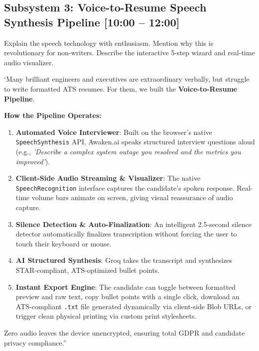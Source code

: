 \documentclass[11pt,a4paper]{article}
\begin{document}
\newpage

\subsection{Subsystem 3: Voice-to-Resume Speech Synthesis Pipeline [10:00 -- 12:00]}

\begin{speakercue}{Explain the speech technology with enthusiasm. Mention why this is revolutionary for non-writers.}
Describe the interactive 5-step wizard and real-time audio visualizer.
\end{speakercue}

`Many brilliant engineers and executives are extraordinary verbally, but struggle to write formatted ATS resumes. For them, we built the \textbf{Voice-to-Resume Pipeline}.

\textbf{How the Pipeline Operates:}
\begin{enumerate}[leftmargin=*]
    \item \textbf{Automated Voice Interviewer}: Built on the browser's native \texttt{SpeechSynthesis} API, Awaken.ai speaks structured interview questions aloud (e.g., \textit{'Describe a complex system outage you resolved and the metrics you improved'}).
    \item \textbf{Client-Side Audio Streaming \& Visualizer}: The native \texttt{SpeechRecognition} interface captures the candidate's spoken response. Real-time volume bars animate on screen, giving visual reassurance of audio capture.
    \item \textbf{Silence Detection \& Auto-Finalization}: An intelligent 2.5-second silence detector automatically finalizes transcription without forcing the user to touch their keyboard or mouse.
    \item \textbf{AI Structured Synthesis}: Groq takes the transcript and synthesizes STAR-compliant, ATS-optimized bullet points.
    \item \textbf{Instant Export Engine}: The candidate can toggle between formatted preview and raw text, copy bullet points with a single click, download an ATS-compliant \texttt{.txt} file generated dynamically via client-side Blob URLs, or trigger clean physical printing via custom print stylesheets.
\end{enumerate}

Zero audio leaves the device unencrypted, ensuring total GDPR and candidate privacy compliance.''

\vspace{0.5em}
\end{document}
